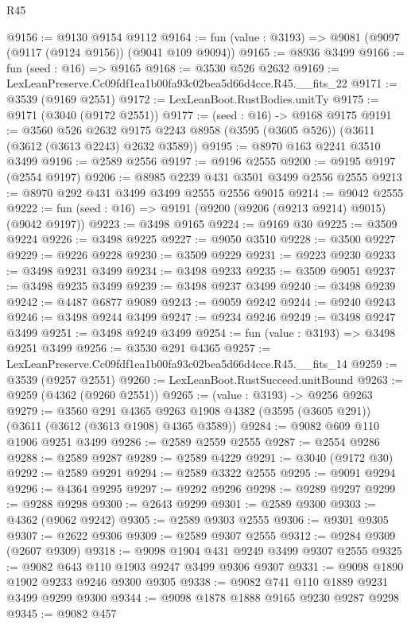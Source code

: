 \begin{lexlean}{R45}
\begin{coremodule}
@9156 := @9130 @9154 @9112
@9164 := fun (value : @3193) => @9081 (@9097 (@9117 (@9124 @9156)) (@9041 @109 @9094))
@9165 := @8936 @3499
@9166 := fun (seed : @16) => @9165
@9168 := @3530 @526 @2632
@9169 := LexLeanPreserve.Cc09fdf1ea1b00fa93c02bea5d66d4cce.R45.__fits_22
@9171 := @3539 (@9169 @2551)
@9172 := LexLeanBoot.RustBodies.unitTy
@9175 := @9171 (@3040 (@9172 @2551))
@9177 := (seed : @16) -> @9168 @9175
@9191 := @3560
    @526
    @2632
    @9175
    @2243
    @8958
    (@3595 (@3605 @526))
    (@3611 (@3612 (@3613 @2243) @2632 @3589))
@9195 := @8970 @163 @2241 @3510 @3499
@9196 := @2589 @2556
@9197 := @9196 @2555
@9200 := @9195 @9197 (@2554 @9197)
@9206 := @8985 @2239 @431 @3501 @3499 @2556 @2555
@9213 := @8970 @292 @431 @3499 @3499 @2555 @2556 @9015
@9214 := @9042 @2555
@9222 := fun (seed : @16) => @9191 (@9200 (@9206 (@9213 @9214) @9015) (@9042 @9197))
@9223 := @3498 @9165
@9224 := @9169 @30
@9225 := @3509 @9224
@9226 := @3498 @9225
@9227 := @9050 @3510
@9228 := @3500 @9227
@9229 := @9226 @9228
@9230 := @3509 @9229
@9231 := @9223 @9230
@9233 := @3498 @9231 @3499
@9234 := @3498 @9233
@9235 := @3509 @9051
@9237 := @3498 @9235 @3499
@9239 := @3498 @9237 @3499
@9240 := @3498 @9239
@9242 := @4487 @6877 @9089
@9243 := @9059 @9242
@9244 := @9240 @9243
@9246 := @3498 @9244 @3499
@9247 := @9234 @9246
@9249 := @3498 @9247 @3499
@9251 := @3498 @9249 @3499
@9254 := fun (value : @3193) => @3498 @9251 @3499
@9256 := @3530 @291 @4365
@9257 := LexLeanPreserve.Cc09fdf1ea1b00fa93c02bea5d66d4cce.R45.__fits_14
@9259 := @3539 (@9257 @2551)
@9260 := LexLeanBoot.RustSucceed.unitBound
@9263 := @9259 (@4362 (@9260 @2551))
@9265 := (value : @3193) -> @9256 @9263
@9279 := @3560
    @291
    @4365
    @9263
    @1908
    @4382
    (@3595 (@3605 @291))
    (@3611 (@3612 (@3613 @1908) @4365 @3589))
@9284 := @9082 @609 @110 @1906 @9251 @3499
@9286 := @2589 @2559 @2555
@9287 := @2554 @9286
@9288 := @2589 @9287
@9289 := @2589 @4229
@9291 := @3040 (@9172 @30)
@9292 := @2589 @9291
@9294 := @2589 @3322 @2555
@9295 := @9091 @9294
@9296 := @4364 @9295
@9297 := @9292 @9296
@9298 := @9289 @9297
@9299 := @9288 @9298
@9300 := @2643 @9299
@9301 := @2589 @9300
@9303 := @4362 (@9062 @9242)
@9305 := @2589 @9303 @2555
@9306 := @9301 @9305
@9307 := @2622 @9306
@9309 := @2589 @9307 @2555
@9312 := @9284 @9309 (@2607 @9309)
@9318 := @9098 @1904 @431 @9249 @3499 @9307 @2555
@9325 := @9082 @643 @110 @1903 @9247 @3499 @9306 @9307
@9331 := @9098 @1890 @1902 @9233 @9246 @9300 @9305
@9338 := @9082 @741 @110 @1889 @9231 @3499 @9299 @9300
@9344 := @9098 @1878 @1888 @9165 @9230 @9287 @9298
@9345 := @9082 @457

\end{coremodule}
\end{lexlean}

